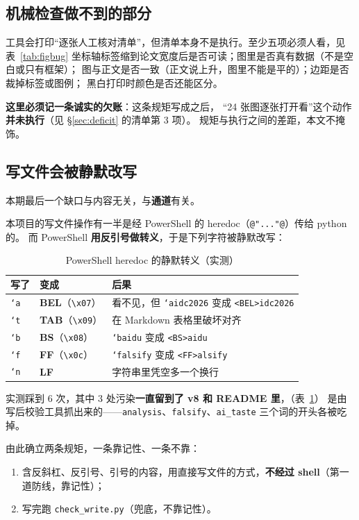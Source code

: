 \documentclass[11pt,a4paper]{article}
\newcommand{\code}[1]{\texttt{#1}}
\begin{document}
\subsection{机械检查做不到的部分}
工具会打印“逐张人工核对清单”，但清单本身不是执行。至少五项必须人看，见表~\ref{tab:figbug}
坐标轴标签缩到论文宽度后是否可读；图里是否真有数据（不是空白或只有框架）；
图与正文是否一致（正文说上升，图里不能是平的）；边距是否裁掉标签或图例；
黑白打印时颜色是否还能区分。

\textbf{这里必须记一条诚实的欠账}：这条规矩写成之后，
“24 张图逐张打开看”这个动作\textbf{并未执行}（见 §\ref{sec:deficit} 的清单第 3 项）。
规矩与执行之间的差距，本文不掩饰。

\subsection{写文件会被静默改写}
本期最后一个缺口与内容无关，与\textbf{通道}有关。

本项目的写文件操作有一半是经 PowerShell 的 heredoc（\code{@"..."@}）传给 python 的。
而 PowerShell \textbf{用反引号做转义}，于是下列字符被静默改写：

\begin{table}[tbp]\centering\small
\caption{PowerShell heredoc 的静默转义（实测）}\label{tab:escape}
\setlength{\tabcolsep}{4pt}
\begin{tabular}{lll}
\toprule
写了 & 变成 & 后果\\
\midrule
\code{`a} & \textbf{BEL}（\code{\textbackslash x07}） & 看不见，但 \code{`aidc2026} 变成 \code{<BEL>idc2026}\\
\code{`t} & \textbf{TAB}（\code{\textbackslash x09}） & 在 Markdown 表格里破坏对齐\\
\code{`b} & \textbf{BS}（\code{\textbackslash x08}） & \code{`baidu} 变成 \code{<BS>aidu}\\
\code{`f} & \textbf{FF}（\code{\textbackslash x0c}） & \code{`falsify} 变成 \code{<FF>alsify}\\
\code{`n} & \textbf{LF} & 字符串里凭空多一个换行\\
\bottomrule
\end{tabular}
\end{table}

实测踩到 6 次，其中 3 处污染\textbf{一直留到了 v8 和 README 里}，（表~\ref{tab:escape}）
是由写后校验工具抓出来的——\code{analysis}、\code{falsify}、\code{ai\_taste}
三个词的开头各被吃掉。

由此确立两条规矩，一条靠记性、一条不靠：
\begin{enumerate}[leftmargin=1.6em,itemsep=2pt]
\item 含反斜杠、反引号、引号的内容，用直接写文件的方式，\textbf{不经过 shell}（第一道防线，靠记性）；
\item 写完跑 \code{check\_write.py}（兜底，不靠记性）。
\end{enumerate}
\end{document}
